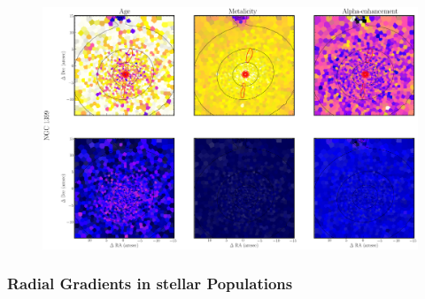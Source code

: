 	\begin{figure}
		\centering
		\includegraphics[height=0.31\textheight]{chapter4/muse/pop2.png}
	\end{figure}


		\subsubsection{Radial Gradients in stellar Populations}
			\label{subsubsec:popGrad}

